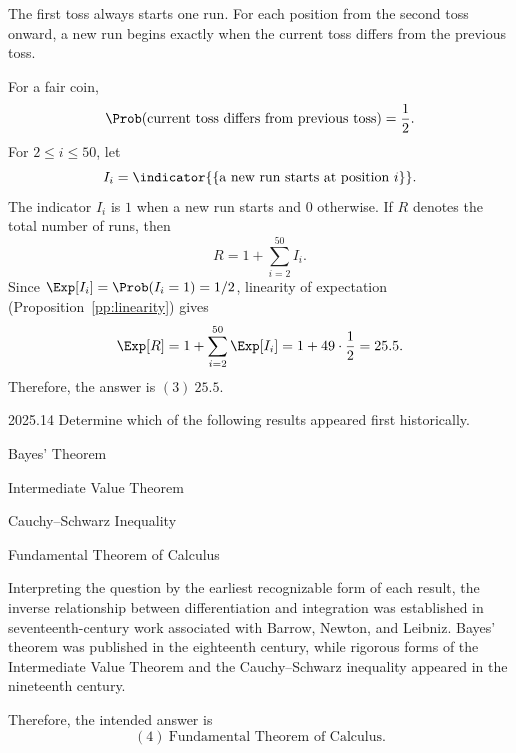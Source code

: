    \begin{solution}
        The first toss always starts one run. For each position from the second toss onward, a new
        run begins exactly when the current toss differs from the previous toss.

        For a fair coin,
        \[
            \Prob(\text{current toss differs from previous toss})=\frac12.
        \]
        For $2\leq i\leq50$, let
        \[
            I_i
            =
            \indicator{\{\text{a new run starts at position }i\}}.
        \]
        The indicator $I_i$ is $1$ when a new run starts and $0$ otherwise. If $R$ denotes the total number of runs, then
        \[
            R=1+\sum_{i=2}^{50}I_i.
        \]
        Since $\Exp[I_i]=\Prob(I_i=1)=1/2$, linearity of expectation (Proposition~\ref{pp:linearity}) gives
        \[
            \Exp[R]
            =
            1+\sum_{i=2}^{50}\Exp[I_i]
            =
            1+49\cdot\frac12
            =
            25.5.
        \]
        Therefore, the answer is $\boxed{(3)\ 25.5}$.
    \end{solution}

    \begin{pastproblem}{2025.14}
        Determine which of the following results appeared first historically.
        \begin{problemchoices}
            \item Bayes' Theorem
            \item Intermediate Value Theorem
            \item Cauchy--Schwarz Inequality
            \item Fundamental Theorem of Calculus
        \end{problemchoices}
    \end{pastproblem}

    \begin{solution}
        Interpreting the question by the earliest recognizable form of each
        result, the inverse relationship between differentiation and integration
        was established in seventeenth-century work associated with Barrow,
        Newton, and Leibniz. Bayes' theorem was published in the eighteenth
        century, while rigorous forms of the Intermediate Value Theorem and the
        Cauchy--Schwarz inequality appeared in the nineteenth century.

        Therefore, the intended answer is
        \[
            \boxed{(4)\ \text{Fundamental Theorem of Calculus}}.
        \]
    \end{solution}

